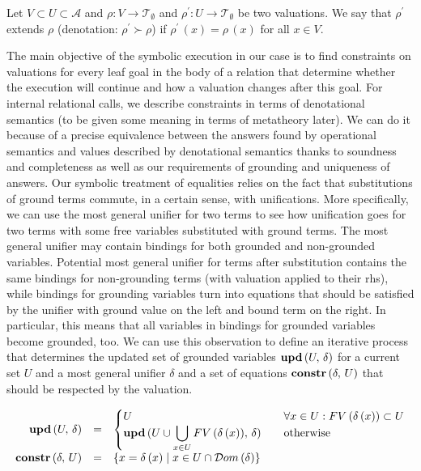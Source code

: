 \begin{definition}
  Let $ V \subset U \subset \mathcal{A} $ and $ \rho \colon V \to \mathcal{T}_{\emptyset} $ and $ \rho^\prime \colon U \to \mathcal{T}_{\emptyset} $ be two valuations. We say that $\rho^\prime$ extends $\rho$ (denotation: $ \rho^\prime \succ \rho$) if $\rho^\prime\,(x) = \rho\,(x)$ for all $x \in V$.
\end{definition}

The main objective of the symbolic execution in our case is to find constraints on valuations for every leaf goal in the body of a relation that determine
whether the execution will continue and how a valuation changes after this goal. For internal relational calls, we describe constraints in terms of denotational
semantics (to be given some meaning in terms of metatheory later). We can do it because of a precise equivalence between the answers found by operational semantics
and values described by denotational semantics thanks to soundness and completeness as well as our requirements of grounding and uniqueness of answers.
Our symbolic treatment of equalities relies on the fact that substitutions of ground terms commute, in a certain sense, with unifications. More specifically,
we can use the most general unifier for two terms to see how unification goes for two terms with some free variables substituted with ground terms.
The most general unifier may contain bindings for both grounded and non-grounded variables. Potential most general unifier for terms after substitution
contains the same bindings for non-grounding terms (with valuation applied to their rhs), while bindings for grounding variables turn into equations that
should be satisfied by the unifier with ground value on the left and bound term on the right. In particular, this means that all variables in bindings for
grounded variables become grounded, too. We can use this observation to define an iterative process that determines the updated set of grounded
variables $\mbox{\textbf{upd}}\,(U,\, \delta)$ for a current set $U$ and a most general unifier $\delta$ and a set of equations $\mbox{\textbf{constr}}\,(\delta,\, U)$ that should be
respected by the valuation.

\[
\begin{array}{rcl}
\mbox{\textbf{upd}}\,(U,\, \delta) &=& \begin{cases}
                           U & \quad\forall x \in U : FV\,(\delta\,(x)) \subset U \\
                           \mbox{\textbf{upd}}\,(U \cup \displaystyle\bigcup\limits_{x \in U} FV\,(\delta\,(x)),\, \delta) & \quad\mbox{otherwise}
                          \end{cases}\\
\mbox{\textbf{constr}}\,(\delta,\, U) &=& \{ x = \delta\,(x) \mid x \in U \cap \mathcal{D}om\,(\delta) \}
\end{array}
\]

